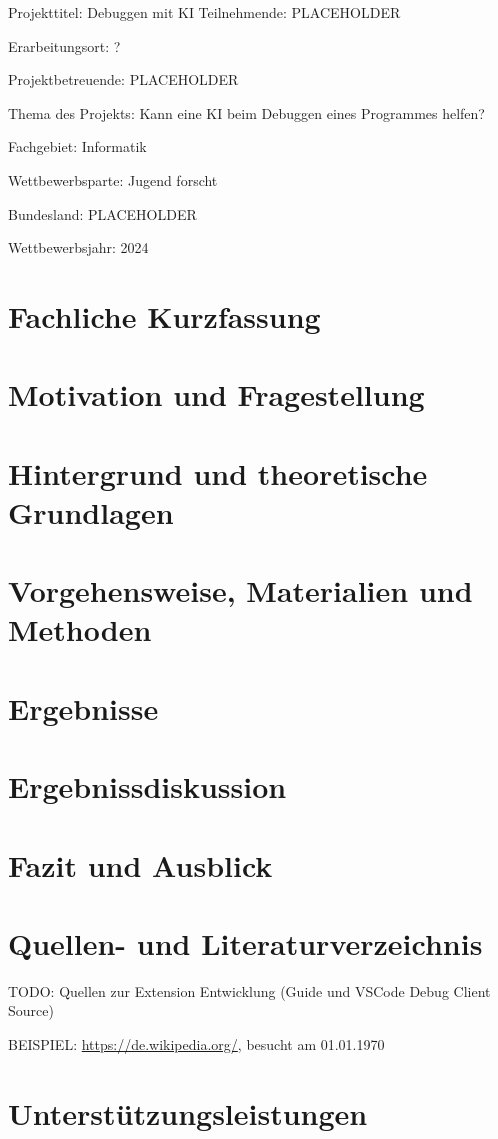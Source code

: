 \documentclass[a4paper,12pt,ngerman]{scrartcl}
\begin{document}
\begin{titlepage}
	Projekttitel: Debuggen mit KI
	\vspace{1cm}
	Teilnehmende: PLACEHOLDER
	
	Erarbeitungsort: ?
	
	Projektbetreuende: PLACEHOLDER
	
	Thema des Projekts: Kann eine KI beim Debuggen eines Programmes helfen?
	
	Fachgebiet: Informatik
	
	Wettbewerbsparte: Jugend forscht
	
	Bundesland: PLACEHOLDER
	
	Wettbewerbsjahr: 2024
	
	\vspace{2cm}
	\vfill
\end{titlepage}
\clearpage
{\normalfont\tableofcontents}
\clearpage

\section{Fachliche Kurzfassung}

\section{Motivation und Fragestellung}

\section{Hintergrund und theoretische Grundlagen}

\section{Vorgehensweise, Materialien und Methoden}

\section{Ergebnisse}

\section{Ergebnissdiskussion}

\section{Fazit und Ausblick}

\section{Quellen- und Literaturverzeichnis}

TODO: Quellen zur Extension Entwicklung (Guide und VSCode Debug Client Source)

BEISPIEL: \url{https://de.wikipedia.org/}, besucht am 01.01.1970

\section{Unterstützungsleistungen}
\end{document}
